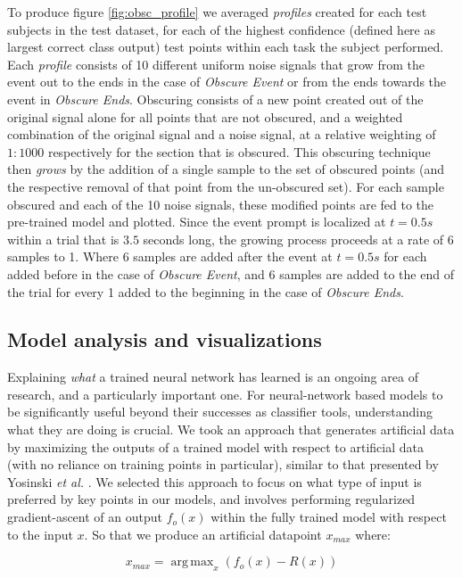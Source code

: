 \documentclass[fleqn,10pt]{wlscirep}
\DeclareMathOperator*{\argmaxA}{arg\,max}
\begin{document}
To produce figure \ref{fig:obsc_profile} we averaged {\em profiles} created for each test subjects in the test dataset, for each of the highest confidence (defined here as largest correct class output) test points within each task the subject performed. Each {\em profile} consists of 10 different uniform noise signals that grow from the event out to the ends in the case of {\em Obscure Event} or from the ends towards the event in {\em Obscure Ends}. Obscuring consists of a new point created out of the original signal alone for all points that are not obscured, and a weighted combination of the original signal and a noise signal, at a relative weighting of $1:1000$ respectively for the section that is obscured. This obscuring technique then {\em grows} by the addition of a single sample to the set of obscured points (and the respective removal of that point from the un-obscured set). For each sample obscured and each of the 10 noise signals, these modified points are fed to the pre-trained model and plotted. Since the event prompt is localized at $t=0.5s$ within a trial that is $3.5$ seconds long, the growing process proceeds at a rate of 6 samples to 1. Where 6 samples are added after the event at $t=0.5s$ for each added before in the case of {\em Obscure Event}, and 6 samples are added to the end of the trial for every 1 added to the beginning in the case of {\em Obscure Ends}.

\subsection*{Model analysis and visualizations} \label{sec:max_act}

Explaining {\em what} a trained neural network has learned is an ongoing area of research, and a particularly important one. For neural-network based models to be significantly useful beyond their successes as classifier tools, understanding what they are doing is crucial. We took an approach that generates artificial data by maximizing the outputs of a trained model with respect to artificial data (with no reliance on training points in particular), similar to that presented by Yosinski {\em et al.} \cite{Yosinski2015}. We selected this approach to focus on what type of input is preferred by key points in our models, and involves performing regularized gradient-ascent of an output $f_o(x)$ within the fully trained model with respect to the input $x$. So that we produce an artificial datapoint $x_{max}$ where:

\begin{equation} \label{eq:max_act}
  x_{max} = \argmaxA_x(f_o(x) - R(x))
\end{equation}
\end{document}
